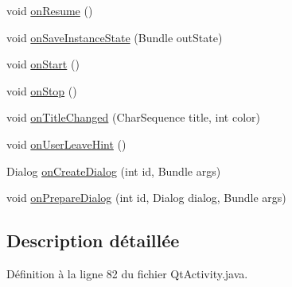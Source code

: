 \begin{DoxyCompactItemize}
void \hyperlink{classorg_1_1qtproject_1_1qt5_1_1android_1_1bindings_1_1_qt_activity_a136a4d6d46f5a88c6e2b9866fa78fc64}{on\-Resume} ()
\item 
void \hyperlink{classorg_1_1qtproject_1_1qt5_1_1android_1_1bindings_1_1_qt_activity_ab32e70bfe633f137c58c82a96bf68f8f}{on\-Save\-Instance\-State} (Bundle out\-State)
\item 
void \hyperlink{classorg_1_1qtproject_1_1qt5_1_1android_1_1bindings_1_1_qt_activity_a5d86c0f23d31274741575dbf916814d1}{on\-Start} ()
\item 
void \hyperlink{classorg_1_1qtproject_1_1qt5_1_1android_1_1bindings_1_1_qt_activity_a2fa87ac6c9b33749654fb05211d7d894}{on\-Stop} ()
\item 
void \hyperlink{classorg_1_1qtproject_1_1qt5_1_1android_1_1bindings_1_1_qt_activity_ab084cdaffe2c7638d6c7e1255aecec3c}{on\-Title\-Changed} (Char\-Sequence title, int color)
\item 
void \hyperlink{classorg_1_1qtproject_1_1qt5_1_1android_1_1bindings_1_1_qt_activity_a86f980854e12f7cf5c8a91f7cbd875d7}{on\-User\-Leave\-Hint} ()
\item 
Dialog \hyperlink{classorg_1_1qtproject_1_1qt5_1_1android_1_1bindings_1_1_qt_activity_a68654d4382feda0419fd1a59792b3643}{on\-Create\-Dialog} (int id, Bundle args)
\item 
void \hyperlink{classorg_1_1qtproject_1_1qt5_1_1android_1_1bindings_1_1_qt_activity_aa4466dc136a61b68aaf83cf3a5a9827d}{on\-Prepare\-Dialog} (int id, Dialog dialog, Bundle args)
\end{DoxyCompactItemize}


\subsection{Description détaillée}


Définition à la ligne 82 du fichier Qt\-Activity.\-java.



